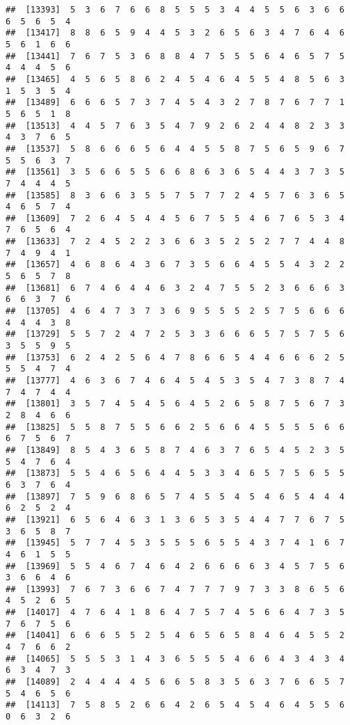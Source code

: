 \documentclass[
]{book}
\begin{document}
\begin{verbatim}
##  [13393]  5  3  6  7  6  6  8  5  5  5  3  4  4  5  5  6  3  6  6  6  5  6  5  4
##  [13417]  8  8  6  5  9  4  4  5  3  2  6  5  6  3  4  7  6  4  6  5  6  1  6  6
##  [13441]  7  6  7  5  3  6  8  8  4  7  5  5  5  6  4  6  5  7  5  4  4  4  5  6
##  [13465]  4  5  6  5  8  6  2  4  5  4  6  4  5  5  4  8  5  6  3  1  5  3  5  4
##  [13489]  6  6  6  5  7  3  7  4  5  4  3  2  7  8  7  6  7  7  1  5  6  5  1  8
##  [13513]  4  4  5  7  6  3  5  4  7  9  2  6  2  4  4  8  2  3  3  4  3  7  6  5
##  [13537]  5  8  6  6  6  5  6  4  4  5  5  8  7  5  6  5  9  6  7  5  5  6  3  7
##  [13561]  3  5  6  6  5  5  6  6  8  6  3  6  5  4  4  3  7  3  5  7  4  4  4  5
##  [13585]  8  3  6  6  3  5  5  7  5  7  7  2  4  5  7  6  3  6  5  4  6  5  7  4
##  [13609]  7  2  6  4  5  4  4  5  6  7  5  5  4  6  7  6  5  3  4  7  6  5  6  4
##  [13633]  7  2  4  5  2  2  3  6  6  3  5  2  5  2  7  7  4  4  8  7  4  9  4  1
##  [13657]  4  6  8  6  4  3  6  7  3  5  6  6  4  5  5  4  3  2  2  5  6  5  7  8
##  [13681]  6  7  4  6  4  4  6  3  2  4  7  5  5  2  3  6  6  6  3  6  6  3  7  6
##  [13705]  4  6  4  7  3  7  3  6  9  5  5  5  2  5  7  5  6  6  6  4  4  4  3  8
##  [13729]  5  5  7  2  4  7  2  5  3  3  6  6  6  5  7  5  7  5  6  3  5  5  9  5
##  [13753]  6  2  4  2  5  6  4  7  8  6  6  5  4  4  6  6  6  2  5  5  5  4  7  4
##  [13777]  4  6  3  6  7  4  6  4  5  4  5  3  5  4  7  3  8  7  4  7  4  7  4  4
##  [13801]  3  5  7  4  5  4  5  6  4  5  2  6  5  8  7  5  6  7  3  2  8  4  6  6
##  [13825]  5  5  8  7  5  5  6  6  2  5  6  6  4  5  5  5  5  6  6  6  7  5  6  7
##  [13849]  8  5  4  3  6  5  8  7  4  6  3  7  6  5  4  5  2  3  5  5  4  7  6  4
##  [13873]  5  5  4  6  5  6  4  4  5  3  3  4  6  5  7  5  6  5  5  6  3  7  6  4
##  [13897]  7  5  9  6  8  6  5  7  4  5  5  4  5  4  6  5  4  4  4  6  2  5  2  4
##  [13921]  6  5  6  4  6  3  1  3  6  5  3  5  4  4  7  7  6  7  5  3  6  5  8  7
##  [13945]  5  7  7  4  5  3  5  5  5  6  5  5  4  3  7  4  1  6  7  4  6  1  5  5
##  [13969]  5  5  4  6  7  4  6  4  2  6  6  6  6  3  4  5  7  5  6  3  6  6  4  6
##  [13993]  7  6  7  3  6  6  7  4  7  7  7  9  7  3  3  8  6  5  6  4  5  2  6  5
##  [14017]  4  7  6  4  1  8  6  4  7  5  7  4  5  6  6  4  7  3  5  7  6  7  5  6
##  [14041]  6  6  6  5  5  2  5  4  6  5  6  5  8  4  6  4  5  5  2  4  7  6  6  2
##  [14065]  5  5  5  3  1  4  3  6  5  5  5  4  6  6  4  3  4  3  4  6  3  4  7  3
##  [14089]  2  4  4  4  4  5  6  6  5  8  3  5  6  3  7  6  6  5  7  5  4  6  5  6
##  [14113]  7  5  8  5  2  6  6  4  2  6  5  4  5  4  6  4  5  5  6  0  6  3  2  6

\end{verbatim}
\end{document}
